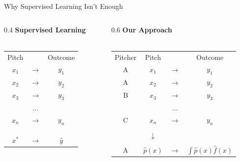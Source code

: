 \documentclass{beamer}
\begin{document}
  \begin{frame}{Why Supervised Learning Isn't Enough}
    \begin{columns}
      \begin{column}{0.4\columnwidth}
        \centering
        {\bf Supervised Learning}\\
        ~\\
        \begin{tabular}{ccc}
          Pitch &               & Outcome\\
          $x_1$ & $\rightarrow$ & $y_1$\\
          $x_2$ & $\rightarrow$ & $y_2$\\
          $x_3$ & $\rightarrow$ & $y_3$\\
                & ...           &      \\
          $x_n$ & $\rightarrow$ & $y_n$\\
          \\
          \\
          \\
          $x^*$ & $\rightarrow$ & $\hat y$\\
        \end{tabular}
      \end{column}
      \begin{column}{0.6\columnwidth}
        \centering
        \alert{\bf Our Approach}\\
        ~\\
        \begin{tabular}{cccc}
          Pitcher & Pitch &               & Outcome\\
          A       & $x_1$ & $\rightarrow$ & $y_1$\\
          A       & $x_2$ & $\rightarrow$ & $y_2$\\
          B       & $x_3$ & $\rightarrow$ & $y_3$\\
                  &       & ...           &      \\
          C       & $x_n$ & $\rightarrow$ & $y_n$\\
                  & \\
                  & \alert{$\downarrow$}\\
                  & \\
          A       & \alert{$\hat p(x)$} & \alert{$\rightarrow$} & \alert{$\int\hat p(x)\hat f(x)$}\\
        \end{tabular}
      \end{column}
    \end{columns}
  \end{frame}
\end{document}
